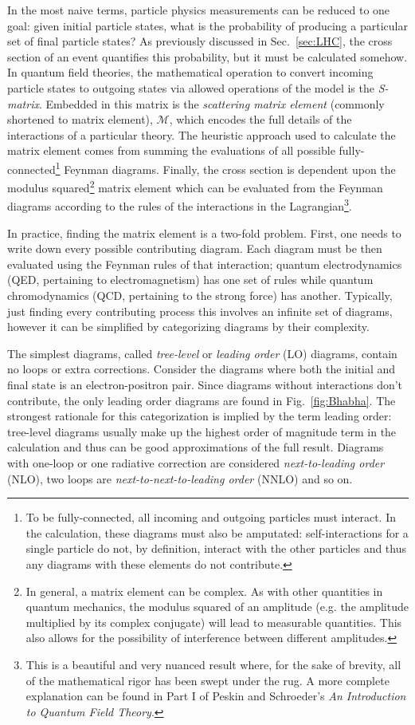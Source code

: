 In the most naive terms, particle physics measurements can be reduced to one goal: given initial particle states, what is the probability of producing a particular set of final particle states? As previously discussed in Sec.~\ref{sec:LHC}, the cross section of an event quantifies this probability, but it must be calculated somehow. In quantum field theories, the mathematical operation to convert incoming particle states to outgoing states via allowed operations of the model is the \textit{S-matrix}. Embedded in this matrix is the \textit{scattering matrix element} (commonly shortened to matrix element), $\mathcal{M}$, which encodes the full details of the interactions of a particular theory. The heuristic approach used to calculate the matrix element comes from summing the evaluations of all possible fully-connected\footnote{To be fully-connected, all incoming and outgoing particles must interact. In the calculation, these diagrams must also be amputated: self-interactions for a single particle do not, by definition, interact with the other particles and thus any diagrams with these elements do not contribute.} Feynman diagrams. Finally, the cross section is dependent upon the modulus squared\footnote{In general, a matrix element can be complex. As with other quantities in quantum mechanics, the modulus squared of an amplitude (e.g. the amplitude multiplied by its complex conjugate) will lead to measurable quantities. This also allows for the possibility of interference between different amplitudes.} matrix element which can be evaluated from the Feynman diagrams according to the rules of the interactions in the Lagrangian\footnote{This is a beautiful and very nuanced result where, for the sake of brevity, all of the mathematical rigor has been swept under the rug. A more complete explanation can be found in Part I of Peskin and Schroeder's \textit{An Introduction to Quantum Field Theory}.}. 

In practice, finding the matrix element is a two-fold problem. First, one needs to write down every possible contributing diagram. Each diagram must be then evaluated using the Feynman rules of that interaction; quantum electrodynamics (QED, pertaining to electromagnetism) has one set of rules while quantum chromodynamics (QCD, pertaining to the strong force) has another. Typically, just finding every contributing process this involves an infinite set of diagrams, however it can be simplified by categorizing diagrams by their complexity.

The simplest diagrams, called \textit{tree-level} or \textit{leading order} (LO) diagrams, contain no loops or extra corrections. Consider the diagrams where both the initial and final state is an electron-positron pair. Since diagrams without interactions don't contribute, the only leading order diagrams are found in Fig.~\ref{fig:Bhabha}. The strongest rationale for this categorization is implied by the term leading order: tree-level diagrams usually make up the highest order of magnitude term in the calculation and thus can be good approximations of the full result. Diagrams with one-loop or one radiative correction are considered \textit{next-to-leading order} (NLO), two loops are \textit{next-to-next-to-leading order} (NNLO) and so on.

